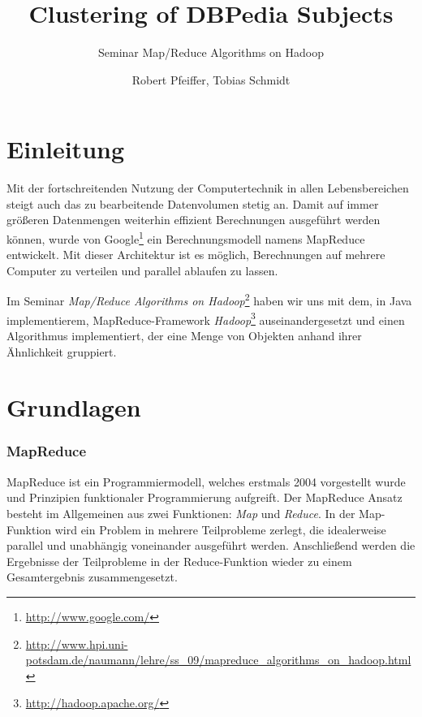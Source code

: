 \documentclass[a4paper]{llncs}
\begin{document}
\title{Clustering of DBPedia Subjects}
\subtitle{Seminar Map/Reduce Algorithms on Hadoop}
\author{Robert Pfeiffer, Tobias Schmidt}

\maketitle

\section{Einleitung}
Mit der fortschreitenden Nutzung der Computertechnik in allen Lebensbereichen steigt auch das zu bearbeitende Datenvolumen stetig an. Damit auf immer größeren Datenmengen weiterhin effizient Berechnungen ausgeführt werden können, wurde von Google\footnote{\url{http://www.google.com/}} ein Berechnungsmodell namens MapReduce entwickelt. Mit dieser Architektur ist es möglich, Berechnungen auf mehrere Computer zu verteilen und parallel ablaufen zu lassen.

Im Seminar \emph{Map/Reduce Algorithms on Hadoop}\footnote{\url{http://www.hpi.uni-potsdam.de/naumann/lehre/ss_09/mapreduce_algorithms_on_hadoop.html}} haben wir uns mit dem, in Java implementierem, MapReduce-Framework \emph{Hadoop}\footnote{\url{http://hadoop.apache.org/}} auseinandergesetzt und einen Algorithmus implementiert, der eine Menge von Objekten anhand ihrer Ähnlichkeit gruppiert.

\section{Grundlagen}

\subsubsection{MapReduce}
MapReduce ist ein Programmiermodell, welches erstmals 2004 vorgestellt wurde \cite{DG04} und Prinzipien funktionaler Programmierung aufgreift. 
Der MapReduce Ansatz besteht im Allgemeinen aus zwei Funktionen: \emph{Map} und \emph{Reduce}. In der Map-Funktion wird ein Problem in mehrere Teilprobleme zerlegt, die idealerweise parallel und unabhängig voneinander ausgeführt werden.
Anschließend werden die Ergebnisse der Teilprobleme in der Reduce-Funktion wieder zu einem Gesamtergebnis zusammengesetzt.
\end{document}
